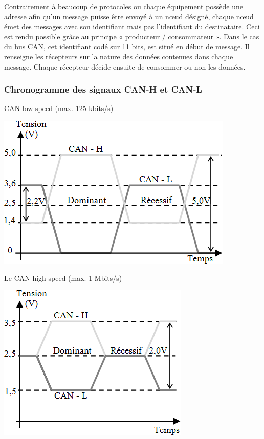 \documentclass[10pt]{article}
\begin{document}
Contrairement à beaucoup de protocoles ou chaque équipement possède une adresse afin qu’un message puisse être envoyé à un nœud désigné, chaque nœud émet des messages avec son identifiant mais pas l’identifiant du destinataire. Ceci est rendu possible grâce au principe « producteur / consommateur ». Dans le cas du bus CAN, cet identifiant codé sur 11 bits, est situé en début de message. Il renseigne les récepteurs sur la nature des données contenues dans chaque message. Chaque récepteur décide ensuite de consommer ou non les données.

\subsubsection*{Chronogramme des signaux CAN-H et CAN-L}

\begin{minipage}[c]{.48\linewidth}
\begin{center}
CAN low speed (max. 125 kbits/s)

\includegraphics[width=.8\textwidth]{images/fig_19}
\end{center}
\end{minipage} \hfill 
\begin{minipage}[c]{.48\linewidth}
\begin{center}
Le CAN high speed (max. 1 Mbits/s)

\includegraphics[width=.8\textwidth]{images/fig_20}
\end{center}
\end{minipage}
\end{document}
